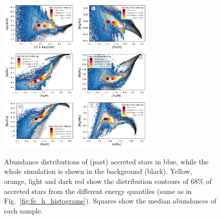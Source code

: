 \documentclass[fleqn,usenatbib]{mnras}
\begin{document}
\begin{figure}
    \centering
    \includegraphics[width=0.33\textwidth]{figures/xfe_feh_zones_NO.png}    \includegraphics[width=0.33\textwidth]{figures/xfe_feh_zones_Mg.png}
    \includegraphics[width=0.33\textwidth]{figures/xfe_feh_zones_Al.png}
    \includegraphics[width=0.33\textwidth]{figures/xfe_feh_zones_Ni.png}
    \includegraphics[width=0.33\textwidth]{figures/xfe_feh_zones_Ba.png}
    \includegraphics[width=0.33\textwidth]{figures/xfe_feh_zones_MgMn.png}
        \caption{Abundance distributions of (past) accreted stars in blue, while the whole simulation is shown in the background (black). Yellow, orange, light and dark red show the distribution contours of 68\% of accreted stars from the different energy quantiles (same as in Fig.~\ref{fig:fe_h_histograms}). Squares show the median abundances of each sample.}
    \label{fig:xfe_feh_zones}
\end{figure}
\end{document}
